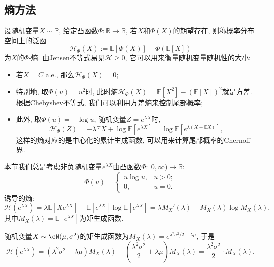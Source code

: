 \subsection{熵方法}

设随机变量$X \sim \mathbb{P}$, 给定凸函数$\Phi \colon \mathbb{R} \to \mathbb{R}$, 若$X$和$\Phi(X)$的期望存在, 则称概率分布空间上的泛函
\begin{equation*}
	\mathcal{H}_\Phi(X) := \mathbb{E}[\Phi(X)] - \Phi(\mathbb{E}[X])  
\end{equation*}
为$X$的$\Phi$-熵.
由Jensen不等式易见$\mathcal{H} \geq 0$, 它可以用来衡量随机变量随机性的大小: 
\begin{itemize}
	\item 若$X = C$ a.e., 那么$\mathcal{H}_\Phi (X) = 0$; 
	\item 特别地, 取$\Phi(u) = u^2$时, 此时熵$\mathcal{H}_\Phi(X) = \mathbb{E}[X^2] - (\mathbb{E}[X])^2$就是方差. 根据Chebyshev不等式, 我们可以利用方差熵来控制尾部概率; 
	\item 此外, 取$\Phi(u) = - \log u$, 随机变量$Z = e^{\lambda X}$时, 
		\begin{equation*}
			\mathcal{H}_\Phi(Z) 
			= - \lambda \mathbb{E}X + \log \mathbb{E}[e^{\lambda X}] 
			= \log \mathbb{E}[e^{\lambda(X - \mathbb{E}X)}], 
		\end{equation*}
		这样的熵对应的是中心化的累计生成函数, 可以用来计算尾部概率的Chernoff界. 
\end{itemize}
本节我们总是考虑非负随机变量$e^{\lambda X}$由凸函数$\Phi \colon [0, \infty) \to \mathbb{R}$: 
\begin{equation*}
	\Phi(u) = 
	\begin{cases}
		u \log u, & u > 0; \\ 0, & u = 0. 
	\end{cases}
\end{equation*}
诱导的熵: 
\begin{equation}\label{eq:EntropyByMGF}
	\mathcal{H}(e^{\lambda X}) 
	= \lambda \mathbb{E}[ X e^{\lambda X}] - \mathbb{E}[e^{\lambda X}] \log \mathbb{E}[e^{\lambda X}]
	= \lambda M_X'(\lambda) - M_X(\lambda) \log M_X(\lambda), 
\end{equation}
其中$M_X(\lambda) = \mathbb{E}[e^{\lambda X}]$为矩生成函数. 

\begin{example}[Gauss随机变量的熵]
	随机变量$X \sim \cN(\mu, \sigma^2)$的矩生成函数为$M_X(\lambda) = e^{\lambda^2 \sigma^2 / 2 + \lambda \mu}$, 于是
	\begin{equation}\label{eq:EntropyOfGaussianRV}
		\mathcal{H}(e^{\lambda X}) 
		= (\lambda^2 \sigma^2 + \lambda \mu) M_X(\lambda) - \left(\frac{\lambda^2 \sigma^2}{2} + \lambda\mu\right) M_X(\lambda) 
		= \frac{\lambda^2 \sigma^2}{2} \cdot M_X(\lambda). 
	\end{equation}
\end{example}


